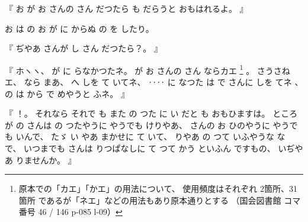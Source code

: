 %
『
お
が
お
さんの
さん
だつたら
も
だらうと
おもはれるよ。
』

%
お
は
の
お
が
に
からぬ
の
を
したり。

%
『
ぢやあ
さんが
し
さん
だつたら？。
』

%
『
ホヽヽ、
%
が
に
らなかつたネ。
%
が
お
さんの
さん%
ならカエ
\footnote{%
原本での「カエ」「かエ」の用法について、
使用頻度はそれぞれ 2箇所、31箇所 であるが「ネエ」などの用法もあり原本通りとする
（国会図書館 コマ番号 46 / 146 p-085 l-09）
}%
。
%
さうさねエ、
%
なら
まあ、
%
へ
しを
て
いてネ、
%
‥‥
に
なつた
は
で
さんに
しを
てネ
、
%
%
の
は
から
で
めやうと
ふネ。
』

%
『
！。
%
それなら
それで
も
また
の
つた
に
い
だと
も
おもひますは。
%
ところが
の
さんは
の
つたやうに
やうでも
けりやあ、
%
さんの
お
ひのやうに
やうでも
いんで、
%
たゞ
い
やあ
まかせに
て
いて、
%
りやあ
の%
つて
いふやうな
な
で、
%
いつまでも
さんは
りつぱなしに
て
つて
かう
といふん
ですもの、
%
いぢやあ
りませんか。
』

